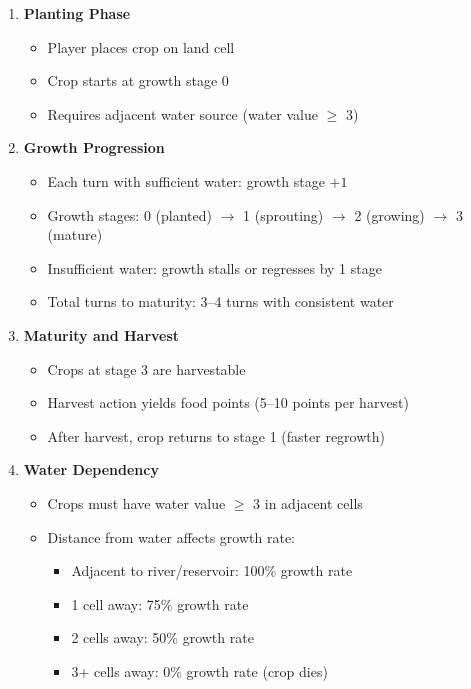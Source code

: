 \documentclass[12pt,a4paper]{article}
\begin{document}
\begin{enumerate}
    \item \textbf{Planting Phase}
    \begin{itemize}
        \item Player places crop on land cell
        \item Crop starts at growth stage 0
        \item Requires adjacent water source (water value $\geq$ 3)
    \end{itemize}
    
    \item \textbf{Growth Progression}
    \begin{itemize}
        \item Each turn with sufficient water: growth stage $+1$
        \item Growth stages: 0 (planted) $\rightarrow$ 1 (sprouting) $\rightarrow$ 2 (growing) $\rightarrow$ 3 (mature)
        \item Insufficient water: growth stalls or regresses by 1 stage
        \item Total turns to maturity: 3--4 turns with consistent water
    \end{itemize}
    
    \item \textbf{Maturity and Harvest}
    \begin{itemize}
        \item Crops at stage 3 are harvestable
        \item Harvest action yields food points (5--10 points per harvest)
        \item After harvest, crop returns to stage 1 (faster regrowth)
    \end{itemize}
    
    \item \textbf{Water Dependency}
    \begin{itemize}
        \item Crops must have water value $\geq$ 3 in adjacent cells
        \item Distance from water affects growth rate:
        \begin{itemize}
            \item Adjacent to river/reservoir: 100\% growth rate
            \item 1 cell away: 75\% growth rate
            \item 2 cells away: 50\% growth rate
            \item 3+ cells away: 0\% growth rate (crop dies)
        \end{itemize}
    \end{itemize}
\end{enumerate}
\end{document}
